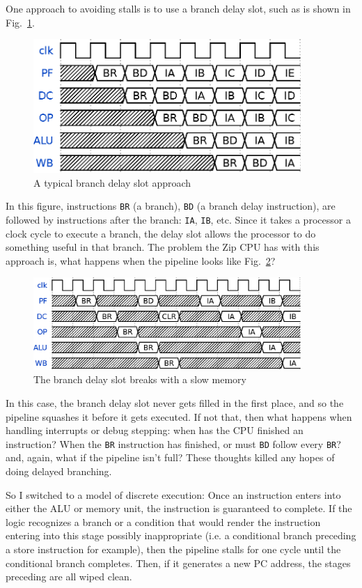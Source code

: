 \documentclass{gqtekspec}
\begin{document}
\begin{itemize}
	One approach to avoiding stalls is to use a branch delay slot,
	such as is shown in Fig.~\ref{fig:brdelay}.
\begin{figure}\begin{center}
\includegraphics[width=4in]{../gfx/bdly.eps}
\caption{A typical branch delay slot approach}\label{fig:brdelay}
\end{center}\end{figure}
	In this figure, instructions
	{\tt BR} (a branch), {\tt BD} (a branch delay instruction),
	are followed by instructions after the branch: {\tt IA}, {\tt IB}, etc.
	Since it takes a processor a clock cycle to execute a branch, the
	delay slot allows the processor to do something useful in that
	branch.  The problem the Zip CPU has with this approach is, what
	happens when the pipeline looks like Fig.~\ref{fig:brbroken}?
\begin{figure}\begin{center}
\includegraphics[width=4in]{../gfx/bdbroken.eps}
\caption{The branch delay slot breaks with a slow memory}\label{fig:brbroken}
\end{center}\end{figure}
	In this case, the branch delay slot never gets filled in the first
	place, and so the pipeline squashes it before it gets executed.
	If not that, then what happens when handling interrupts or
	debug stepping: when has the CPU finished an instruction?
	When the {\tt BR} instruction has finished, or must {\tt BD}
	follow every {\tt BR}?  and, again, what if the pipeline isn't
	full?
	These thoughts killed any hopes of doing delayed branching.

	So I switched to a model of discrete execution: Once an instruction
	enters into either the ALU or memory unit, the instruction is
	guaranteed to complete.  If the logic recognizes a branch or a 
	condition that would render the instruction entering into this stage
	possibly inappropriate (i.e. a conditional branch preceding a store
	instruction for example), then the pipeline stalls for one cycle
	until the conditional branch completes.  Then, if it generates a new
	PC address, the stages preceding are all wiped clean.


\end{itemize}
\end{document}
